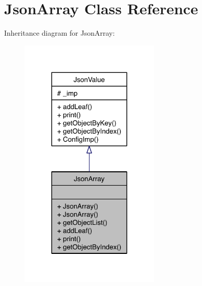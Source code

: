 \hypertarget{class_json_array}{\section{Json\-Array Class Reference}
\label{class_json_array}
}


Inheritance diagram for Json\-Array\-:
\nopagebreak
\begin{figure}[H]
\begin{center}
\leavevmode
\includegraphics[width=190pt]{class_json_array__inherit__graph}
\end{center}
\end{figure}


